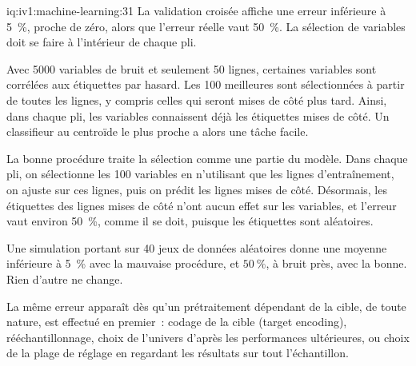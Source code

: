 \begin{solution}{iq:iv1:machine-learning:31}
La validation croisée affiche une erreur inférieure à 5~\%, proche de zéro, alors que l'erreur réelle vaut 50~\%. La sélection de variables doit se faire à l'intérieur de chaque pli.

Avec 5000 variables de bruit et seulement 50 lignes, certaines variables sont corrélées aux étiquettes par hasard. Les 100 meilleures sont sélectionnées à partir de toutes les lignes, y compris celles qui seront mises de côté plus tard. Ainsi, dans chaque pli, les variables connaissent déjà les étiquettes mises de côté. Un classifieur au centroïde le plus proche a alors une tâche facile.

La bonne procédure traite la sélection comme une partie du modèle. Dans chaque pli, on sélectionne les 100 variables en n'utilisant que les lignes d'entraînement, on ajuste sur ces lignes, puis on prédit les lignes mises de côté. Désormais, les étiquettes des lignes mises de côté n'ont aucun effet sur les variables, et l'erreur vaut environ 50~\%, comme il se doit, puisque les étiquettes sont aléatoires.

Une simulation portant sur 40 jeux de données aléatoires donne une moyenne inférieure à 5~\% avec la mauvaise procédure, et $50~\%$, à bruit près, avec la bonne. Rien d'autre ne change.

La même erreur apparaît dès qu'un prétraitement dépendant de la cible, de toute nature, est effectué en premier~: codage de la cible (target encoding), rééchantillonnage, choix de l'univers d'après les performances ultérieures, ou choix de la plage de réglage en regardant les résultats sur tout l'échantillon.



\end{solution}

